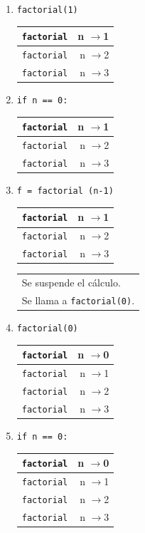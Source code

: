 \begin{enumerate}
\item  \verb|factorial(1)              |
	\begin{tabular}{r|r|}
	\hline
	\verb|factorial|&n $\rightarrow$1\\
	\hline
	\hline
	\verb|factorial|&n $\rightarrow$2\\
	\hline
	\hline
	\verb|factorial|&n $\rightarrow$3\\
	\hline
	\end{tabular}

\item  \verb|if n == 0:                |
	\begin{tabular}{r|r|}
	\hline
	\verb|factorial|&n $\rightarrow$1\\
	\hline
	\hline
	\verb|factorial|&n $\rightarrow$2\\
	\hline
	\hline
	\verb|factorial|&n $\rightarrow$3\\
	\hline
	\end{tabular}

\item  \verb|f = factorial (n-1)       |
	\begin{tabular}{r|r|}
	\hline
	\verb|factorial|&n $\rightarrow$1\\
	\hline
	\hline
	\verb|factorial|&n $\rightarrow$2\\
	\hline
	\hline
	\verb|factorial|&n $\rightarrow$3\\
	\hline
	\end{tabular}
	\begin{tabular}{l}
	Se suspende el cálculo. \\
	Se llama a \verb|factorial(0)|.
	\end{tabular}

\item  \verb|factorial(0)              |
	\begin{tabular}{r|r|}
	\hline
	\verb|factorial|&n $\rightarrow$0\\
	\hline
	\hline
	\verb|factorial|&n $\rightarrow$1\\
	\hline
	\hline
	\verb|factorial|&n $\rightarrow$2\\
	\hline
	\hline
	\verb|factorial|&n $\rightarrow$3\\
	\hline
	\end{tabular}

\item  \verb|if n == 0:                |
	\begin{tabular}{r|r|}
	\hline
	\verb|factorial|&n $\rightarrow$0\\
	\hline
	\hline
	\verb|factorial|&n $\rightarrow$1\\
	\hline
	\hline
	\verb|factorial|&n $\rightarrow$2\\
	\hline
	\hline
	\verb|factorial|&n $\rightarrow$3\\
	\hline
	\end{tabular}


\end{enumerate}
